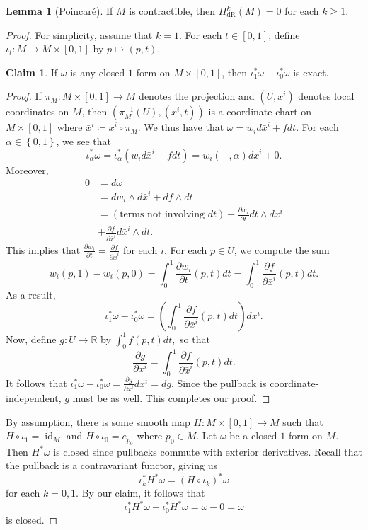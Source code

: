 \documentclass[10pt,letterpaper,cm]{nupset}
\theoremstyle{definition}
\theoremstyle{theorem}
\newtheorem{lemma}[definition]{Lemma}
\newtheorem*{claim}{Claim}
\theoremstyle{remark}
\newcommand{\R}{\mathbb R}
\newcommand{\1}{\mathbf{1}}
\newcommand{\0}{\vec 0}
\DeclareMathOperator{\id}{id}
\DeclareMathOperator{\dr}{dR}
\begin{document}
\begin{lemma}[Poincar\'e]
If $M$ is  contractible, then $H_{\dr}^k(M) = 0$ for each $k\geq 1$.
\end{lemma}
\begin{proof}
For simplicity, assume that $k=1$. For each $t\in \left[0,1\right]$, define $\iota_t : M \to M \times \left[0,1\right]$ by $p\mapsto (p, t)$.
\begin{claim} If $\omega$ is any closed $1$-form  on $M\times \left[0,1\right]$, then $\iota^{\ast}_1\omega -\iota^{\ast}_0\omega$ is exact. \end{claim}
\begin{proof} If $\pi_M : M \times \left[0,1\right] \to M$ denotes the projection and $(U, x^i)$ denotes local coordinates on $M$, then $\left(\pi_M^{-1}(U), (\bar{x}^i, t)\right)$ is a coordinate chart on $M \times \left[0,1\right]$ where $\bar{x}^i \coloneqq  x^i \circ \pi_M$. We thus have that $\omega = w_id\bar{x}^i+ f dt$. For each $\alpha \in \left\{0,1\right\}$, we see that $$ \iota^{\ast}_{\alpha}\omega = \iota^{\ast}_{\alpha}(w_id\bar{x}^i +fdt)=w_i({-}, \alpha)dx^i +0  .$$ Moreover, 
\begin{align*}  0 & =d\omega
\\ &  =dw_i \wedge d\bar{x}^i +df \wedge dt \\ & = \left(\text{terms not involving }dt\right) +\frac{\partial{w_i}}{\partial{t}}dt \wedge d\bar{x}^i 
\\ & +\frac{\partial{f}}{\partial{\bar{x}^i}}d\bar{x}^i\wedge dt  . \end{align*}
This implies that $\frac{\partial{w_i}}{\partial{t}} = \frac{\partial{f}}{\partial{\bar{x}^i}}$ for each $i$. For each $p\in U$, we compute the sum 
$$ w_i(p, 1) -w_i(p,0) = \int_0^1  \frac{\partial{w_i}}{\partial{t}}(p, t)dt =  \int_0^1 \frac{\partial{f}}{\partial{\bar{x}^i}}(p,t)dt .$$ As a result, $$\iota^{\ast}_1 \omega -\iota^{\ast}_0 \omega =  \left( \int_0^1 \frac{\partial{f}}{\partial{\bar{x}^i}}(p,t)dt \right)dx^i .$$ Now, define $g: U \to \R$ by $\int_0^1f(p,t)dt,$ so that $$\frac{\partial{g}}{\partial{x^i}} = \int_0^1\frac{\partial{f}}{\partial{\bar{x}^i}}(p,t)dt.$$ It follows that $\iota^{\ast}_1 \omega -\iota^{\ast}_0 \omega  = \frac{\partial{g}}{\partial{x^i}}dx^i = dg.$
 Since the pullback is coordinate-independent, $g$ must be as well. This completes our proof.
\end{proof}
By assumption, there is some smooth map $H: M \times \left[0,1\right] \to M$ such that $H \circ \iota_1 =\id_M$ and $H \circ \iota_0 = e_{p_0}$ where $p_0 \in M$. Let $\omega$ be a closed $1$-form  on $M$. Then $H^{\ast} \omega$ is closed since pullbacks commute with exterior derivatives. Recall that the pullback is a contravariant functor, giving us
\[
 \iota^{\ast}_k H^{\ast}\omega = \left(H \circ \iota_k\right)^{\ast}\omega
\] for each $k=0,1$. By our claim, it follows that $$\iota^{\ast}_1H^{\ast}\omega - \iota^{\ast}_0 H^{\ast}\omega = \omega -0 = \omega$$ is closed.
\end{proof}
\end{document}
